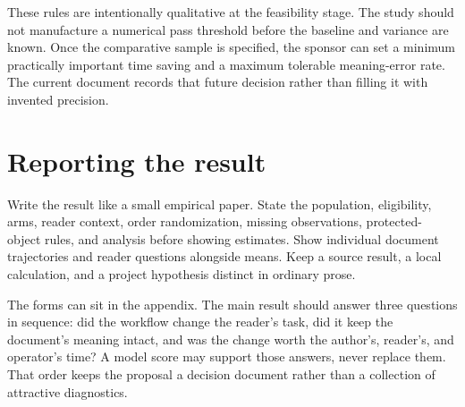 These rules are intentionally qualitative at the feasibility stage. The study
should not manufacture a numerical pass threshold before the baseline and
variance are known. Once the comparative sample is specified, the sponsor can
set a minimum practically important time saving and a maximum tolerable
meaning-error rate. The current document records that future decision rather
than filling it with invented precision.

\section{Reporting the result}
\label{sec:eval-reporting}

Write the result like a small empirical paper. State the population, eligibility,
arms, reader context, order randomization, missing observations, protected-
object rules, and analysis before showing estimates. Show individual document
trajectories and reader questions alongside means. Keep a source result, a
local calculation, and a project hypothesis distinct in ordinary prose.

The forms can sit in the appendix. The main result should answer three
questions in sequence: did the workflow change the reader's task, did it keep
the document's meaning intact, and was the change worth the author's, reader's,
and operator's time? A model score may support those answers, never replace
them. That order keeps the proposal a decision document rather than a
collection of attractive diagnostics.
